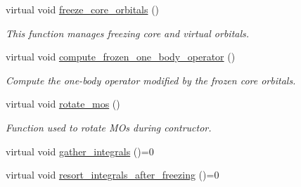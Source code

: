 \begin{DoxyCompactItemize}
\item 
virtual void \mbox{\hyperlink{classforte_1_1_forte_integrals_a0736cf358a7f4376ddf437da981a6a83}{freeze\+\_\+core\+\_\+orbitals}} ()
\begin{DoxyCompactList}\small\item\em This function manages freezing core and virtual orbitals. \end{DoxyCompactList}\item 
virtual void \mbox{\hyperlink{classforte_1_1_forte_integrals_a5dd931996d9b7b93fec4c635e67d8d83}{compute\+\_\+frozen\+\_\+one\+\_\+body\+\_\+operator}} ()
\begin{DoxyCompactList}\small\item\em Compute the one-\/body operator modified by the frozen core orbitals. \end{DoxyCompactList}\item 
virtual void \mbox{\hyperlink{classforte_1_1_forte_integrals_ad93f0d9805c265930ef77363d3b8f8ec}{rotate\+\_\+mos}} ()
\begin{DoxyCompactList}\small\item\em Function used to rotate M\+Os during contructor. \end{DoxyCompactList}\item 
virtual void \mbox{\hyperlink{classforte_1_1_forte_integrals_ab7f509d211328763c589db5e83b7b144}{gather\+\_\+integrals}} ()=0
\item 
virtual void \mbox{\hyperlink{classforte_1_1_forte_integrals_a733b77acfb8c47c59e764e9c7602d6bc}{resort\+\_\+integrals\+\_\+after\+\_\+freezing}} ()=0
\end{DoxyCompactItemize}
